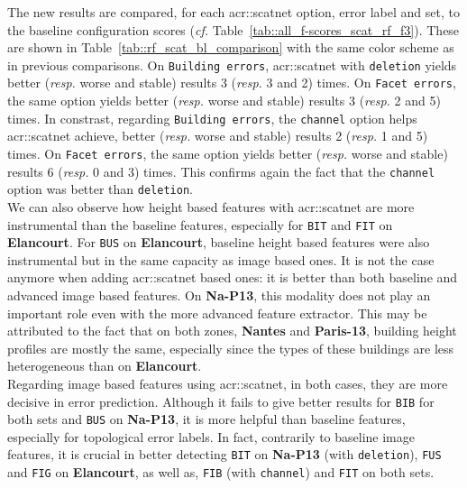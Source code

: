             The new results are compared, for each \gls{acr::scatnet} option, error label and set, to the baseline configuration scores (\textit{cf.} Table~\ref{tab::all_f-scores_scat_rf_f3}).
            These are shown in Table~\ref{tab::rf_scat_bl_comparison} with the same color scheme as in previous comparisons.
            On \texttt{Building errors}, \gls{acr::scatnet} with \texttt{deletion} yields better (\textit{resp.} worse and stable) results 3 (\textit{resp.} 3 and 2) times.
            On \texttt{Facet errors}, the same option yields better (\textit{resp.} worse and stable) results 3 (\textit{resp.} 2 and 5) times.
            In constrast, regarding \texttt{Building errors}, the \texttt{channel} option helps \gls{acr::scatnet} achieve, better (\textit{resp.} worse and stable) results 2 (\textit{resp.} 1 and 5) times.
            On \texttt{Facet errors}, the same option yields better (\textit{resp.} worse and stable) results 6 (\textit{resp.} 0 and 3) times.
            This confirms again the fact that the \texttt{channel} option was better than \texttt{deletion}.\\

            We can also observe how height based features with \gls{acr::scatnet} are more instrumental than the baseline features, especially for \texttt{BIT} and \texttt{FIT} on \textbf{Elancourt}.
            For \texttt{BUS} on \textbf{Elancourt}, baseline height based features were also instrumental but in the same capacity as image based ones.
            It is not the case anymore when adding \gls{acr::scatnet} based ones: it is better than both baseline and advanced image based features.
            On \textbf{Na-P13}, this modality does not play an important role even with the more advanced feature extractor.
            This may be attributed to the fact that on both zones, \textbf{Nantes} and \textbf{Paris-13}, building height profiles are mostly the same, especially since the types of these buildings are less heterogeneous than on \textbf{Elancourt}.\\

            Regarding image based features using \gls{acr::scatnet}, in both cases, they are more decisive in error prediction.
            Although it fails to give better results for \texttt{BIB} for both sets and \texttt{BUS} on \textbf{Na-P13}, it is more helpful than baseline features, especially for topological error labels.
            In fact, contrarily to baseline image features, it is crucial in better detecting \texttt{BIT} on \textbf{Na-P13} (with \texttt{deletion}), \texttt{FUS} and \texttt{FIG} on \textbf{Elancourt}, as well as, \texttt{FIB} (with \texttt{channel}) and \texttt{FIT} on both sets.\\

